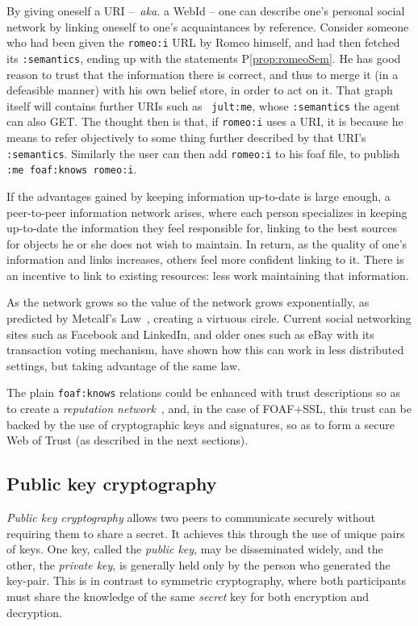 \documentclass{llncs}
\begin{document}
By giving oneself a URI --~{\em aka.} a WebId -- one can describe one's
personal social network by linking oneself to one's acquaintances by
reference.  Consider someone who had been given the {\tt romeo:i} URL
by Romeo himself, and had then fetched its {\tt :semantics}, ending up with the
statements  P\ref{prop:romeoSem}. He has
good reason to trust that the information there is correct,
and thus to merge it (in a defeasible manner) with his own belief
store, in order to act on it.
That graph itself will contains further URIs such as {\tt
  jult:me}, whose {\tt :semantics} the agent can also GET. The thought then is that, if {\tt romeo:i}
uses a URI, it is because he means to refer objectively to some thing further described 
by that URI's {\tt :semantics}. Similarly the user can then add {\tt romeo:i} to his foaf file, to publish
{\tt :me foaf:knows romeo:i}.

If the advantages gained by keeping information up-to-date is large
enough, a peer-to-peer information network arises, where each person
specializes in keeping up-to-date the information they feel
responsible for, linking to the best sources for objects he or she
does not wish to maintain. In return, as the quality
of one's information and links increases, others feel more confident
linking to it. There is an incentive to link to existing resources:
less work maintaining that information. 

As the network grows so the
value of the network grows exponentially, as predicted by Metcalf's
Law~\cite{SemWebMetcalf}, creating a virtuous circle.  Current social 
networking sites such as Facebook and LinkedIn, and older ones such
as eBay with its  transaction voting mechanism,  have shown how this can work 
in less distributed settings, but taking advantage of the same law.

The plain {\tt foaf:knows} relations could be enhanced with trust descriptions so as to create a {\em
  reputation network}~\cite{DBLP:conf/www/GolbeckPH03}, and, in the
case of FOAF+SSL, this trust can be backed by the use of cryptographic
keys and signatures, so as to form a secure Web of Trust (as described
in the next sections).

\subsection{Public key cryptography}

{\em Public key cryptography} allows two peers to communicate securely
without requiring them to share a secret.  It achieves this through
the use of unique pairs of keys.  One key, called the {\em public
  key}, may be disseminated widely, and the other, the {\em private
  key}, is generally held only by the person who generated the
key-pair.  This is in contrast to symmetric cryptography, where both
participants must share the knowledge of the same {\em secret} key for
both encryption and decryption.
\end{document}
